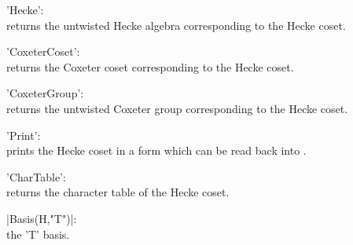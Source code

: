 'Hecke':\\ returns the untwisted Hecke algebra corresponding to the Hecke
     coset.

'CoxeterCoset':\\  returns the Coxeter coset   corresponding to the Hecke
     coset.

'CoxeterGroup':\\ returns the  untwisted  Coxeter group corresponding  to
     the Hecke coset.

'Print':\\ prints the Hecke  coset in a form  which can be read back into
     \GAP.

'CharTable':\\ returns the character table of the Hecke coset.

|Basis(H,"T")|:\\ the 'T' basis.

